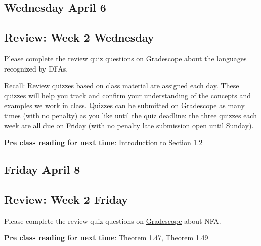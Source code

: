 \newpage
\subsection*{Wednesday April 6}



\newpage
\subsection*{Review: Week 2 Wednesday}

Please complete the review quiz questions on \href{http://gradescope.com}{Gradescope} about 
the languages recognized by DFAs.


Recall: Review quizzes based on class material are assigned each day. 
These quizzes will help you track and confirm your understanding of the concepts and examples 
we work in class. Quizzes can be submitted on Gradescope as many times (with no penalty) as 
you like until the quiz deadline: the three quizzes each week are all due on Friday (with no penalty 
late submission open until Sunday).


{\bf Pre class reading for next time}: Introduction to Section 1.2

\newpage
\subsection*{Friday April 8}




\newpage

\subsection*{Review: Week 2 Friday}


Please complete the review quiz questions on \href{http://gradescope.com}{Gradescope} about 
NFA.

{\bf Pre class reading for next time}: Theorem 1.47, Theorem 1.49

